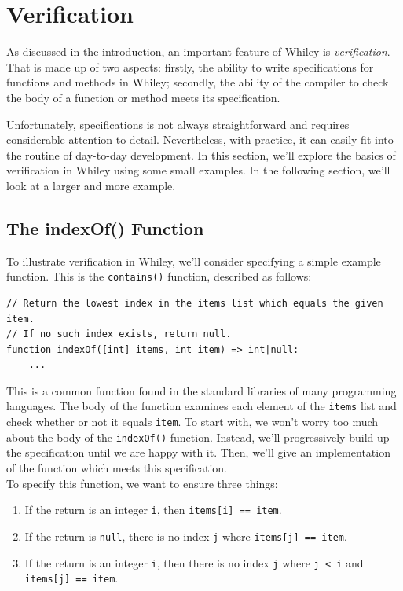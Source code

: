 \newpage
\section{Verification}

As discussed in the introduction, an important feature of Whiley is
{\em verification}.  That is made up of two aspects: firstly, the
ability to write specifications for functions and methods in Whiley;
secondly, the ability of the compiler to check the body of a function
or method meets its specification.

Unfortunately, specifications is not always straightforward and
requires considerable attention to detail.  Nevertheless, with
practice, it can easily fit into the routine of day-to-day
development.  In this section, we'll explore the basics of
verification in Whiley using some small examples.  In the following
section, we'll look at a larger and more example.

\subsection{The indexOf() Function} 
To illustrate verification in Whiley, we'll consider specifying a
simple example function.  This is the \lstinline{contains()} function,
described as follows:

\begin{lstlisting}
// Return the lowest index in the items list which equals the given item.
// If no such index exists, return null.
function indexOf([int] items, int item) => int|null:
    ...
\end{lstlisting}

This is a common function found in the standard libraries of many
programming languages.  The body of the function examines each element
of the \lstinline{items} list and check whether or not it equals
\lstinline{item}.  To start with, we won't worry too much about the
body of the \lstinline{indexOf()} function.  Instead, we'll
progressively build up the specification until we are happy with it.
Then, we'll give an implementation of the function which meets this
specification.\\

\noindent To specify this function, we want to ensure three things:

\begin{enumerate}
\item If the return is an integer \lstinline{i}, then
  \lstinline{items[i] == item}.
\item If the return is \lstinline{null}, there is no index
  \lstinline{j} where \lstinline{items[j] == item}.
\item If the return is an integer \lstinline{i}, then there is
  no index \lstinline{j} where \lstinline{j < i} and
  \lstinline{items[j] == item}.
\end{enumerate}

